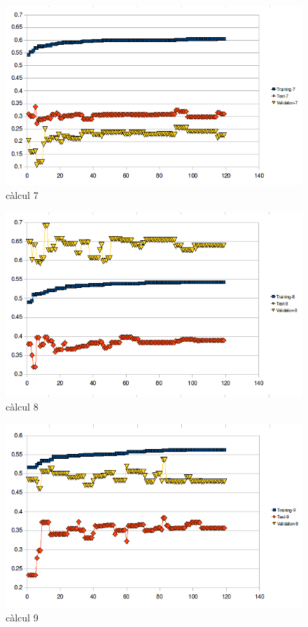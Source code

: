 \begin{figure}[h]
\begin{center}
\includegraphics[scale=0.75]{pholus/pholus7.png}
\end{center}
\caption{càlcul 7}
\label{fig:pholusResult7}
\end{figure}

\begin{figure}[h]
\begin{center}
\includegraphics[scale=0.75]{pholus/pholus8.png}
\end{center}
\caption{càlcul 8}
\label{fig:pholusResult8}
\end{figure}

\begin{figure}[h]
\begin{center}
\includegraphics[scale=0.75]{pholus/pholus9.png}
\end{center}
\caption{càlcul 9}
\label{fig:pholusResult9}
\end{figure}

